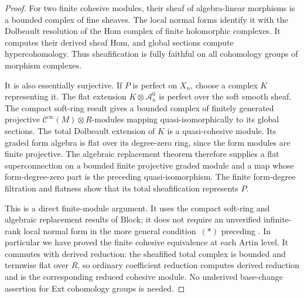 \documentclass[11pt]{article}
\theoremstyle{definition}
\theoremstyle{remark}
\begin{document}
\begin{proof}
For two finite cohesive modules, their sheaf of algebra-linear
morphisms is a bounded complex of fine sheaves.  The local normal
forms identify it with the Dolbeault resolution of the Hom
complex of finite holomorphic complexes.  It computes their
derived sheaf Hom, and global sections compute hypercohomology.
Thus sheafification is fully faithful on all cohomology groups
of morphism complexes.

It is also essentially surjective.  If $P$ is perfect on $X_n$,
choose a complex $K$ representing it.  The flat extension
$K\otimes\mathcal A_n^0$ is perfect over the soft smooth sheaf.
The compact soft-ring result
\cite[Proposition~4.1.2]{BlockCohesive} gives a bounded complex
of finitely generated projective
$\mathcal C^\infty(M)\otimes R$-modules mapping
quasi-isomorphically to its global sections.  The total
Dolbeault extension of $K$ is a quasi-cohesive module.  Its
graded form algebra is flat over its degree-zero ring, since
the form modules are finite projective.  The algebraic
replacement theorem \cite[Theorem~3.2.7(2)]{BlockCohesive}
therefore supplies a flat superconnection on a bounded finite
projective graded module and a map whose form-degree-zero part
is the preceding quasi-isomorphism.  The finite form-degree
filtration and flatness show that its total sheafification
represents $P$.

This is a direct finite-module argument.  It uses the compact
soft-ring and algebraic replacement results of Block; it does
not require an unverified infinite-rank local normal form in
the more general condition~$(*)$ preceding
\cite[Theorem~7.9]{CHLCohesive}.  In particular we have proved
the finite cohesive equivalence at each Artin level.  It commutes
with derived reduction: the sheafified total complex is bounded
and termwise flat over $R$, so ordinary coefficient reduction
computes derived reduction and is the corresponding reduced
cohesive module.  No underived base-change assertion for Ext
cohomology groups is needed.


\end{proof}
\end{document}

